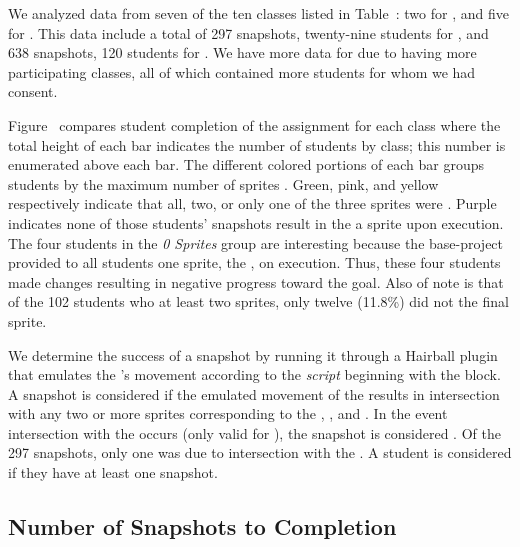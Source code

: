 We analyzed data from seven of the ten classes listed in
Table~: two for \sone{}, and five for \stwo{}. This
data include a total of 297 snapshots, twenty-nine students for \sone{}, and
638 snapshots, 120 students for \stwo{}. We have more data for \stwo{} due to
having more participating classes, all of which contained more students for
whom we had consent.

Figure~ compares student completion of the
assignment for each class where the total height of each bar indicates the
number of students by class; this number is enumerated above each bar. The
different colored portions of each bar groups students by the maximum number of
sprites \caught{}. Green, pink, and yellow respectively indicate that all, two,
or only one of the three sprites were \caught{}. Purple indicates none of those
students' snapshots result in the \net{}  a sprite upon
execution. The four students in the \emph{0 Sprites} group are interesting
because the base-project provided to all students  one sprite, the
\zebra{}, on execution. Thus, these four students made changes resulting in
negative progress toward the goal. Also of note is that of the 102 students who
\caught{} at least two sprites, only twelve (11.8\%) did not \catch{} the final
sprite.

We determine the success of a snapshot by running it through a Hairball plugin
that emulates the \net{}'s movement according to the \net{} \emph{script}
beginning with the \netclicked{} block. A snapshot is considered \com{} if the
emulated movement of the \net{} results in intersection with any two or more
sprites corresponding to the \bear{}, \horse{}, and \zebra{}. In the event
intersection with the \snake{} occurs (only valid for \sone{}), the snapshot is
considered \incom{}. Of the 297 \sone{} snapshots, only one was \incom{} due to
intersection with the \snake{}. A student is considered \com{} if they have at
least one \com{} snapshot.

\subsection{Number of Snapshots to Completion}


